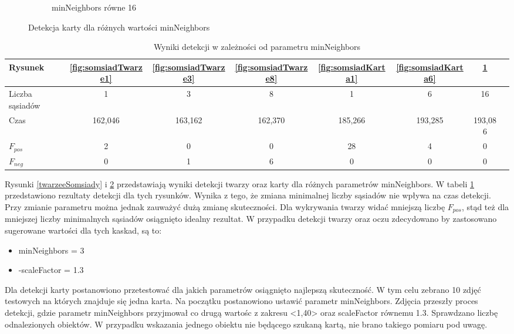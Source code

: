 \begin{figure}[H]
\begin{subfigure}{0.32\textwidth}
        \caption{minNeighbors równe 16}
        \label{fig:somsiadKarta16}
    \end{subfigure}
    \caption{Detekcja karty dla różnych wartości minNeighbors}
    \label{kartySomsiady}
\end{figure}


\begin{table}[H]
    \caption{Wyniki detekcji w zależności od parametru minNeighbors}
    \label{tab:somsiady}
    \begin{tabular}{|l|c|c|c|c|c|c|c|}
\hline
Rysunek & \ref{fig:somsiadTwarze1} & \ref{fig:somsiadTwarze3} & \ref{fig:somsiadTwarze8} & \ref{fig:somsiadKarta1} & \ref{fig:somsiadKarta6} & \ref{fig:somsiadKarta16}\\
\hline
Liczba sąsiadów & 1 & 3 & 8 & 1 & 6 & 16\\
\hline
Czas & 162,046 & 163,162 & 162,370 & 185,266 & 193,285 & 193,086\\
\hline
$F_{pos}$ & 2 & 0 & 0 & 28 & 4 & 0\\
\hline
$F_{neg}$ & 0 & 1 & 6 & 0 & 0 & 0\\
\hline
\end{tabular}
\end{table}

Rysunki \ref{twarzeeSomsiady} i \ref{kartySomsiady} przedstawiają wyniki detekcji twarzy oraz karty dla różnych parametrów minNeighbors. W tabeli \ref{tab:somsiady} przedstawiono rezultaty detekcji dla tych rysunków. Wynika z tego, że zmiana minimalnej liczby sąsiadów nie wpływa na czas detekcji. Przy zmianie parametru można jednak zauważyć dużą zmianę skuteczności. Dla wykrywania twarzy widać mniejszą liczbę ${F_{pos}}$, stąd też dla mniejszej liczby minimalnych sąsiadów osiągnięto idealny rezultat.
W przypadku detekcji twarzy oraz oczu zdecydowano by zastosowano sugerowane wartości dla tych kaskad, są to:
\begin{itemize}
    \item minNeighbors = 3
    \item -scaleFactor = 1.3
\end{itemize}

Dla detekcji karty postanowiono przetestować dla jakich parametrów osiągnięto najlepszą skuteczność. W tym celu zebrano 10 zdjęć testowych na których znajduje się jedna karta. Na początku postanowiono ustawić parametr minNeighbors.
Zdjęcia przeszły proces detekcji, gdzie parametr minNeighbors przyjmował co drugą wartośc z zakresu <1,40> oraz scaleFactor równemu 1.3. Sprawdzano liczbę odnalezionych obiektów. W przypadku wskazania jednego obiektu nie będącego szukaną kartą, nie brano takiego pomiaru pod uwagę.

